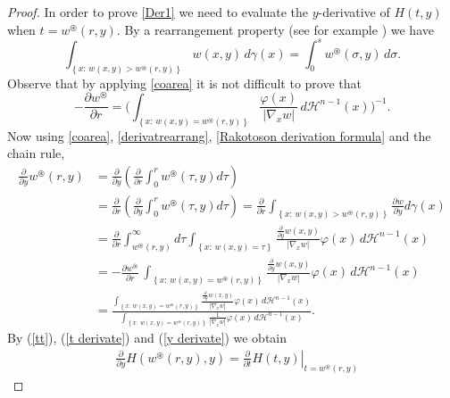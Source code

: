 \documentclass[a4paper,10pt,reqno]{amsart}
\numberwithin{equation}{section}
\begin{document}
\begin{proof}
In order to prove \eqref{Der1} we need to evaluate the $y$-derivative of
$H(t,y)$ when $t=w^{\circledast}(r,y).$ By a rearrangement property (see for example \cite{Bennett}) we have
\begin{equation}
\int_{\left\{x:\,w(x,y)>w^{\circledast}(r,y)\right\}}w(x,y)\,d\gamma(x)=\int_{0}^{s}w^{\circledast}(\sigma,y)\,d\sigma.\label{ww}%
\end{equation}
Observe that by applying \eqref{coarea} it is not difficult to prove that
\begin{equation}
-\frac{\partial w^{\circledast}}{\partial r}=\Bigg(\int_{\left\{x:\,w(x,y)=w^{\circledast}(r,y)\right\}}\frac{\varphi(x)}{|\nabla_{x}w|}\,d\mathcal{H}^{n-1}(x)\Bigg)^{-1}\label{derivatrearrang}.
\end{equation}
Now using \eqref{coarea}, \eqref{derivatrearrang}, \eqref{Rakotoson derivation formula} and the chain rule,
\begin{align}
\frac{\partial}{\partial y}w^{\circledast}(r,y)&=\frac{\partial}{\partial y}\left(\frac{\partial}{\partial
r}\int_{0}^{r}w^{\circledast}(\tau,y)d\tau\right)\nonumber\\
&=\frac{\partial}{\partial r}\left(\frac{\partial}{\partial y}\int_{0}^{r}w^{\circledast}(\tau,y)d\tau\right)
=\frac{\partial}{\partial r}\int_{\left\{x:\,w(x,y)>w^{\circledast}(r,y)\right\}}\frac{\partial w}{\partial y}d\gamma(x)\label{tt}\\
&=\frac{\partial}{\partial r}\int_{w^{\circledast}(r,y)}^{\infty}d\tau\int_{\left\{x:\,w(x,y)=\tau\right\}}\frac{\frac{\partial }{\partial
y}w(x,y)}{|\nabla_{x}w|}\varphi(x)\,d\mathcal{H}^{n-1}(x)\nonumber\\
&=-\frac{\partial w^{\circledast}}{\partial r}\,\int_{\left\{x:\,w(x,y)=w^{\circledast}(r,y)\right\}}\frac{\frac{\partial }{\partial
y}w(x,y)}{|\nabla_{x}w|}\varphi(x)\,d\mathcal{H}^{n-1}(x)\nonumber\\
&=\frac{\displaystyle\int_{\left\{x:\,w(x,y)=w^{\circledast}(r,y)\right\}}\frac{\frac{\partial}{\partial
y}w(x,y)}{\left\vert \nabla_{x}w\right\vert }\varphi(x)\,d
\mathcal{H}^{n-1}(x)}{\displaystyle\int_{\left\{x:\,w(x,y)=w^{\circledast}(r,y)\right\}}\frac{1}{\left\vert
\nabla_{x}w\right\vert }\varphi(x)\,d\mathcal{H}^{n-1}(x)\nonumber%
}.
\end{align}
By (\ref{tt}), (\ref{t derivate}) and (\ref{y derivate}) we obtain%
\begin{align}
&\frac{\partial}{\partial y}H(w^{\circledast}(r,y),y)   =\left.
\frac{\partial}{\partial t}H(t,y)\right\vert _{t=w^{\circledast}(r,y)}%

\end{align}
\end{proof}
\end{document}
